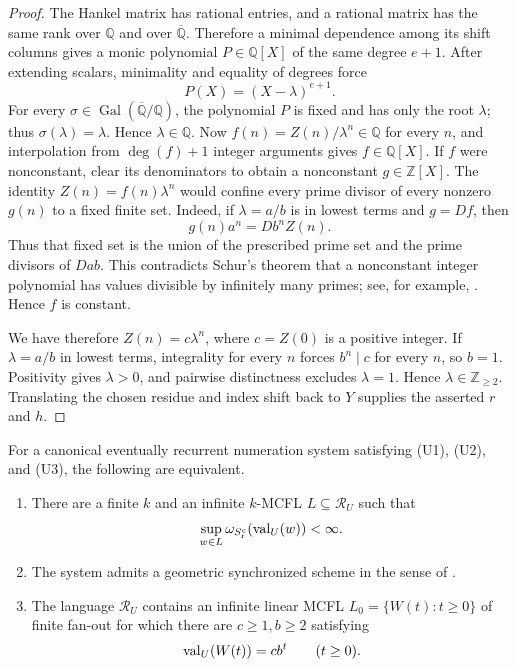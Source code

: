 \begin{proof}
  The Hankel matrix has rational entries, and a rational matrix has the
  same rank over \(\mathbb Q\) and over \(\overline{\mathbb Q}\).
  Therefore a minimal dependence among its shift columns gives a monic
  polynomial \(P\in\mathbb Q[X]\) of the same degree \(e+1\). After
  extending scalars, minimality and equality of degrees force
  \[
    P(X)=(X-\lambda)^{e+1}.
  \]
  For every
  \(\sigma\in\operatorname{Gal}(\overline{\mathbb Q}/\mathbb Q)\), the
  polynomial \(P\) is fixed and has only the root \(\lambda\); thus
  \(\sigma(\lambda)=\lambda\). Hence \(\lambda\in\mathbb Q\). Now
  \(f(n)=Z(n)/\lambda^n\in\mathbb Q\)
  for every \(n\), and interpolation from \(\deg(f)+1\) integer
  arguments gives \(f\in\mathbb Q[X]\). If \(f\) were nonconstant, clear its
  denominators to obtain a nonconstant \(g\in\mathbb Z[X]\). The
  identity \(Z(n)=f(n)\lambda^n\) would confine every prime divisor of
  every nonzero \(g(n)\) to a fixed finite set. Indeed, if
  \(\lambda=a/b\) is in lowest terms and \(g=Df\), then
  \[
    g(n)a^n=Db^nZ(n).
  \]
  Thus that fixed set is the union of the prescribed prime set and the
  prime divisors of \(Dab\). This contradicts Schur's theorem that a
  nonconstant integer polynomial has values divisible by infinitely
  many primes; see, for example, \cite{HardyWright2008}. Hence \(f\) is
  constant.

  We have therefore \(Z(n)=c\lambda^n\), where
  \(c=Z(0)\) is a positive integer. If \(\lambda=a/b\) in lowest terms,
  integrality for every \(n\) forces \(b^n\mid c\) for every \(n\), so
  \(b=1\). Positivity gives \(\lambda>0\), and pairwise distinctness
  excludes \(\lambda=1\). Hence \(\lambda\in\mathbb Z_{\ge2}\).
  Translating the chosen residue and
  index shift back to \(Y\) supplies the asserted \(r\) and \(h\).
\end{proof}

\begin{theorem}
  \label{thm:bounded-outside-support-geometric-ray}
  For a canonical eventually recurrent numeration system satisfying
  \textup{(U1)}, \textup{(U2)}, and \textup{(U3)}, the following are
  equivalent.
  \begin{enumerate}[label=\textup{(\roman*)}]
    \item There are a finite \(k\) and an infinite \(k\)-MCFL
    \(L\subseteq\mathcal R_U\) such that
    \[
      \sup_{w\in L}\omega_{S_{\mathrm r}^c}(\operatorname{val}_U(w))<\infty.
    \]
    \item The system admits a geometric synchronized scheme in the
    sense of .
    \item The language \(\mathcal R_U\) contains an infinite linear MCFL
    \(L_0=\{W(t):t\ge0\}\) of finite fan-out for which there are
    \(c\ge1,b\ge2\) satisfying
    \[
      \operatorname{val}_U(W(t))=cb^t\qquad(t\ge0).
    \]
  \end{enumerate}
\end{theorem}

